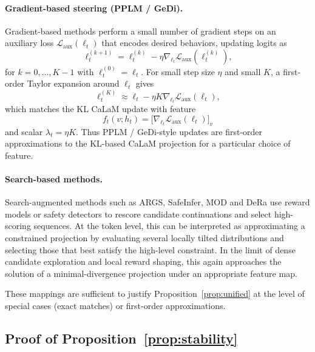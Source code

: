 \documentclass{article}
\theoremstyle{plain}
\theoremstyle{definition}
\theoremstyle{remark}
\begin{document}
\paragraph{Gradient-based steering (PPLM / GeDi).}
Gradient-based methods perform a small number of gradient steps on an auxiliary loss $\mathcal{L}_\text{aux}(\ell_t)$ that encodes desired behaviors, updating logits as
\begin{equation}
  \ell_t^{(k+1)}
  =
  \ell_t^{(k)} - \eta \nabla_{\ell_t} \mathcal{L}_\text{aux}(\ell_t^{(k)}),
\end{equation}
for $k=0,\dots,K-1$ with $\ell_t^{(0)} = \ell_t$.
For small step size $\eta$ and small $K$, a first-order Taylor expansion around $\ell_t$ gives
\begin{equation}
  \ell_t^{(K)}
  \approx
  \ell_t - \eta K \nabla_{\ell_t} \mathcal{L}_\text{aux}(\ell_t),
\end{equation}
which matches the KL CaLaM update with feature
\begin{equation}
  f_t(v;h_t)
  =
  \big[\nabla_{\ell_t} \mathcal{L}_\text{aux}(\ell_t)\big]_v
\end{equation}
and scalar $\lambda_t = \eta K$.
Thus PPLM / GeDi-style updates are first-order approximations to the KL-based CaLaM projection for a particular choice of feature.

\paragraph{Search-based methods.}
Search-augmented methods such as ARGS, SafeInfer, MOD and DeRa use reward models or safety detectors to rescore candidate continuations and select high-scoring sequences.
At the token level, this can be interpreted as approximating a constrained projection by evaluating several locally tilted distributions and selecting those that best satisfy the high-level constraint.
In the limit of dense candidate exploration and local reward shaping, this again approaches the solution of a minimal-divergence projection under an appropriate feature map.

These mappings are sufficient to justify Proposition~\ref{prop:unified} at the level of special cases (exact matches) or first-order approximations.

\subsection{Proof of Proposition~\ref{prop:stability}}
\label{app:stability}
\end{document}
